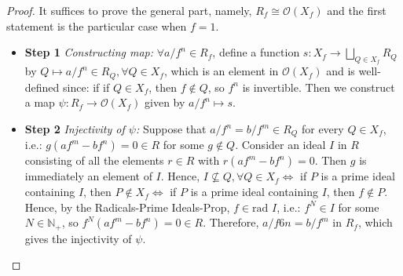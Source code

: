 \begin{proof}
    It suffices to prove the general part, namely, $R_f \cong \mathcal{O}(X_f)$ and the first statement is the particular case when $f=1$.
    \begin{itemize}
        \item \textbf{Step 1} \textit{Constructing map:} $\forall a/f^n \in R_f$, define a function $s :X_f \to \bigsqcup_{Q\in X_f} R_Q$ by $Q \mapsto a/f^n \in R_Q ,\forall Q\in X_f$, which is an element in $\mathcal{O} (X_f)$ and is well-defined since: if if $Q\in X_f$, then $f \notin Q$, so $f^n$ is invertible. Then we construct a map $\psi: R_f \to \mathcal{O} (X_f)$ given by $a/f^n \mapsto s$.

        \item \textbf{Step 2} \textit{Injectivity of $\psi$:} Suppose that $a/f^n =b/f^m \in R_Q$ for every $Q \in X_f$, i.e.: $g(af^m-bf^n) =0 \in R$ for some $g\notin Q$. Consider an ideal $I$ in $R$ consisting of all the elements $r\in R$ with $r (af^m- bf^n )=0$. Then $g$ is immediately an element of $I$. Hence, $I \not\subseteq Q ,\forall Q \in X_f \Leftrightarrow$ if $P$ is a prime ideal containing $I$, then $P \notin X_f \Leftrightarrow$ if $P$ is a prime ideal containing $I$, then $f\notin P$. Hence, by the Radicals-Prime Ideals-Prop, $f\in \text{rad }I$, i.e.: $f^N \in I$ for some $N \in \mathbb{N}_+$, so $f^N(af^m- bf^n)=0 \in R$. Therefore, $a/f6n=b/f^m$ in $R_f$, which gives the injectivity of $\psi$.


\end{itemize}
\end{proof}
